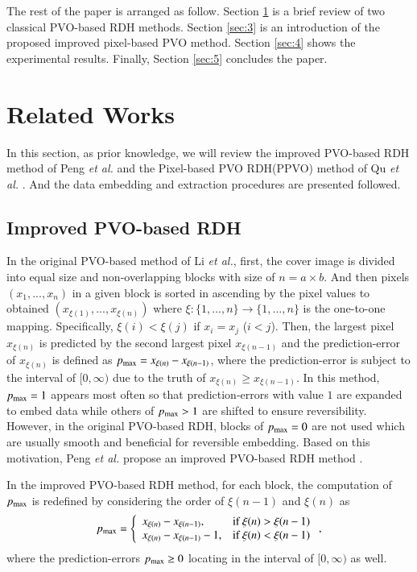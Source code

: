 \documentclass[review,3p,10pt,sort&compress]{elsarticle}
\begin{document}
The rest of the paper is arranged as follow. Section \ref{sec:2} is a brief review of two classical PVO-based RDH methods. Section \ref{sec:3} is an introduction of the proposed improved pixel-based PVO method. Section \ref{sec:4} shows the experimental results. Finally, Section \ref{sec:5} concludes the paper.

\section{Related Works}\label{sec:2}
In this section, as prior knowledge, we will review the improved PVO-based RDH method of Peng \emph{et al.} \cite{Peng2014IPVO} and the Pixel-based PVO RDH(PPVO) method of Qu \emph{et al.} \cite{Qu2015PPVO}. And the data embedding and extraction procedures are presented followed.

\subsection{Improved PVO-based RDH \cite{Peng2014IPVO}}\label{sec:2.1}
In the original PVO-based method \cite{Li2013PVO} of Li \emph{et al.}, first, the cover image is divided into equal size and non-overlapping blocks with size of $n = a \times b$. And then pixels $(x_{1},...,x_{n})$ in a given block is sorted in ascending by the pixel values to obtained $(x_{\xi(1)},...,x_{\xi(n)})$ where $\xi : \{1,...,n\} \rightarrow \{1,...,n\}$ is the one-to-one mapping. Specifically, $\xi(i) < \xi(j)$ if $x_{i} = x_{j}$ ($i < j$). Then, the largest pixel $x_{\xi(n)}$ is predicted by the second largest pixel $x_{\xi(n-1)}$ and the prediction-error of $x_{\xi(n)}$ is defined as $p_{\rm max} = x_{\xi(n)} - x_{\xi(n-1)}$, where the prediction-error is subject to the interval of $[0, \infty)$ due to the truth of $x_{\xi(n)} \geq x_{\xi(n-1)}$. In this method, $p_{\rm max} = 1$ appears  most often so that prediction-errors with value $1$ are expanded to embed data while others of $p_{\rm max} > 1$ are shifted to ensure reversibility. However, in the original PVO-based RDH, blocks of $p_{\rm max} = 0$ are not used which are usually smooth and beneficial for reversible embedding. Based on this motivation, Peng \emph{et al.} propose an improved PVO-based RDH method \cite{Peng2014IPVO}.

In the improved PVO-based RDH method, for each block, the computation of $p_{\rm max}$ is redefined by considering the order of $\xi(n-1)$ and $\xi(n)$ as
\begin{equation}\label{eq:pmax}
p_{\rm max} = \left\{\begin{array}{ll}
x_{\xi(n)} - x_{\xi(n-1)},      & \text{if } \xi(n) > \xi(n-1) \\
x_{\xi(n)} - x_{\xi(n-1)} - 1,  & \text{if } \xi(n) < \xi(n-1)
\end{array}\right.,
\end{equation}
where the prediction-errors $p_{\rm max} \geq 0$ locating in the interval of $[0, \infty)$ as well.
\end{document}
